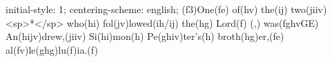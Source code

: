initial-style: 1;
centering-scheme: english;
(f3)One(fe) of(hv) the(ij) two(jiiv) <sp>*</sp> who(hi) fol(jv)lowed(ih/ij) the(hg) Lord(f) (,) was(fghvGE) An(hijv)drew,(jiiv) Si(hi)mon(h) Pe(ghiv)ter's(h) broth(hg)er,(fe) al(fv)le(ghg)lu(f)ia.(f)
